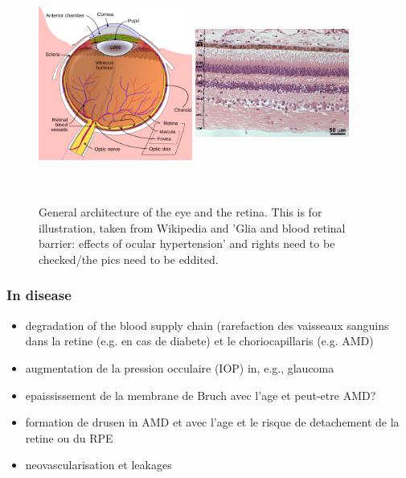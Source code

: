\documentclass[12pt,a4paper]{journal}
\begin{document}
\begin{figure}[h]
  \centering
  \includegraphics[width=0.45\textwidth, height=7cm]{ArchitectureEye} %
  \hfill
  \includegraphics[width=0.45\textwidth, height=7cm]{RetinaHistology}
  \caption{General architecture of the eye and the retina. This is for illustration, taken from Wikipedia and 'Glia and blood retinal barrier: effects of ocular hypertension' and rights need to be checked/the pics need to be eddited.}
  \label{fig:architecture-eye}
\end{figure}


\subsubsection{In disease}

\begin{itemize}
\item degradation of the blood supply chain (rarefaction des vaisseaux sanguins dans la retine (e.g. en cas de diabete) et le choriocapillaris (e.g. AMD)
\item augmentation de la pression occulaire (IOP) in, e.g., glaucoma
\item epaississement de la membrane de Bruch avec l'age et peut-etre AMD?
\item formation de drusen in AMD et avec l'age et le risque de detachement de la retine ou du RPE
\item neovascularisation et leakages
\end{itemize}
\end{document}
